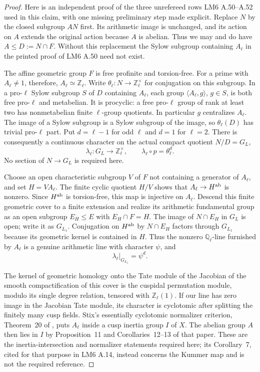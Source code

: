 \begin{proof}
Here is an independent proof of the three unrefereed rows LM6
A.50--A.52 used in this claim, with one missing preliminary step
made explicit.  Replace $N$ by the closed subgroup $AN$ first.
Its arithmetic image is unchanged, and its action on $A$ extends
the original action because $A$ is abelian.  Thus we may and do
have $A\leq D:=N\cap F$.  Without this replacement the Sylow subgroup
containing $A_\ell$ in the printed proof of LM6 A.50 need not exist.

The affine geometric group $F$ is free profinite and torsion-free.
For a prime with $A_\ell\ne1$, therefore, $A_\ell\simeq\mathbb Z_\ell$.
Write $\theta_\ell:N\to\mathbb Z_\ell^\times$ for conjugation on this
subgroup.  In a pro-$\ell$ Sylow subgroup $S$ of $D$ containing
$A_\ell$, each group $\langle A_\ell,g\rangle$, $g\in S$, is both
free pro-$\ell$ and metabelian.  It is procyclic: a free pro-$\ell$
group of rank at least two has nonmetabelian finite $\ell$-group
quotients.  In particular $g$ centralizes $A_\ell$.  The image of
a Sylow subgroup is a Sylow subgroup of the image, so
$\theta_\ell(D)$ has trivial pro-$\ell$ part.  Put $d=\ell-1$ for
odd $\ell$ and $d=1$ for $\ell=2$.  There is consequently a continuous
character on the actual compact quotient $N/D=G_L$,
\[
 \lambda_\ell:G_L\longrightarrow\mathbb Z_\ell^\times,
       \qquad \lambda_\ell\circ p=\theta_\ell^d.       \tag{B.29.2}
\]
No section of $N\to G_L$ is required here.

Choose an open characteristic subgroup $V$ of $F$ not containing
a generator of $A_\ell$, and set $H=VA_\ell$.  The finite cyclic
quotient $H/V$ shows that $A_\ell\to H^{\rm ab}$ is nonzero.
Since $H^{\rm ab}$ is torsion-free, this map is injective on
$A_\ell$.  Descend this finite geometric cover to a finite
extension and realize its arithmetic fundamental group as an
open subgroup $E_H\leq E$ with $E_H\cap F=H$.  The image of
$N\cap E_H$ in $G_L$ is open; write it as $G_{L_1}$.
Conjugation on $H^{\rm ab}$ by $N\cap E_H$ factors through
$G_{L_1}$ because its geometric kernel is contained in $H$.
Thus the nonzero $\mathbb Q_\ell$-line furnished by $A_\ell$
is a genuine arithmetic line with character $\psi$, and
\[
                   \lambda_\ell|_{G_{L_1}}=\psi^d.          \tag{B.29.3}
\]

The kernel of geometric homology onto the Tate module of the
Jacobian of the smooth compactification of this cover is the
cuspidal permutation module, modulo its single degree relation,
tensored with $\mathbb Z_\ell(1)$.  If our line has zero image in
the Jacobian Tate module, its character is cyclotomic after
splitting the finitely many cusp fields.  Stix's essentially
cyclotomic normalizer criterion, Theorem~20 of
\cite{CEStixCuspidal2008}, puts $A_\ell$ inside a cusp inertia
group $I$ of $X$.  The abelian group $A$ then lies in $I$ by
Proposition~11 and Corollaries~12--13 of that paper.  These are
the inertia-intersection and normalizer statements required
here; its Corollary~7, cited for that purpose in LM6 A.14,
instead concerns the Kummer map and is not the required reference.


\end{proof}
